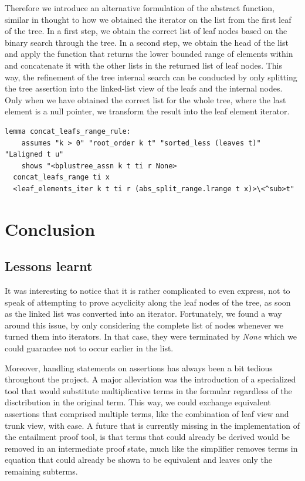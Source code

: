 \documentclass[a4paper,UKenglish,cleveref, autoref, thm-restate]{lipics-v2021}
\begin{document}
Therefore we introduce an alternative formulation of the
abstract function, similar in thought to how we obtained the iterator
on the list from the first leaf of the tree.
In a first step, we obtain the correct list of leaf nodes
based on the binary search through the tree.
In a second step, we obtain the head of the list and apply
the function that returns the lower bounded range of elements within
and concatenate it with the other lists in the returned list of leaf nodes.
This way, the refinement of the tree internal search
can be conducted by only splitting the tree assertion into the linked-list view of the leafs
and the internal nodes.
Only when we have obtained the correct list for the whole tree,
where the last element is a null pointer,
we transform the result into the leaf element iterator.

\begin{lstlisting}[mathescape=true, language=Isabelle,label=lst:btree-leafs-range]
lemma concat_leafs_range_rule:
    assumes "k > 0" "root_order k t" "sorted_less (leaves t)" "Laligned t u"
    shows "<bplustree_assn k t ti r None>
  concat_leafs_range ti x
  <leaf_elements_iter k t ti r (abs_split_range.lrange t x)>\<^sub>t"
\end{lstlisting}



\section{Conclusion}
\label{sec:conclusion}

\subsection{Lessons learnt}

It was interesting to notice that it is rather complicated
to even express, not to speak of attempting to prove acyclicity
 along the leaf nodes of the tree, as soon as the linked list was converted into an iterator.
Fortunately, we found a way around this issue, by only considering
the complete list of nodes whenever we turned them into
iterators. In that case, they were terminated by \textit{None}
which we could guarantee not to occur earlier in the list.

Moreover, handling statements on assertions has always been
a bit tedious throughout the project.
A major alleviation was the introduction of a specialized tool
that would substitute multiplicative terms in the formular
regardless of the disctribution in the original term.
This way, we could exchange equivalent assertions that comprised
multiple terms, like the combination of leaf view and trunk view,
with ease.
A future that is currently missing in the implementation of the entailment
proof tool, is that terms that could already be derived
would be removed in an intermediate proof state,
much like the simplifier removes terms in equation that could
already be shown to be equivalent and leaves only the remaining subterms.
\end{document}
